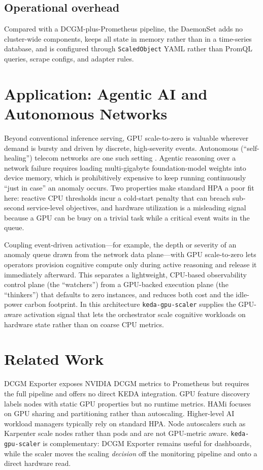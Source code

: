 \documentclass[11pt]{article}
\begin{document}
\subsection{Operational overhead}
Compared with a DCGM-plus-Prometheus pipeline, the DaemonSet adds no cluster-wide
components, keeps all state in memory rather than in a time-series database, and
is configured through \texttt{ScaledObject} YAML rather than PromQL queries,
scrape configs, and adapter rules.

\section{Application: Agentic AI and Autonomous Networks}

Beyond conventional inference serving, GPU scale-to-zero is valuable wherever
demand is bursty and driven by discrete, high-severity events. Autonomous
(``self-healing'') telecom networks are one such setting \cite{comsoc}. Agentic
reasoning over a network failure requires loading multi-gigabyte foundation-model
weights into device memory, which is prohibitively expensive to keep running
continuously ``just in case'' an anomaly occurs. Two properties make standard HPA
a poor fit here: reactive CPU thresholds incur a cold-start penalty that can
breach sub-second service-level objectives, and hardware utilization is a
misleading signal because a GPU can be busy on a trivial task while a critical
event waits in the queue.

Coupling event-driven activation---for example, the depth or severity of an
anomaly queue drawn from the network data plane---with GPU scale-to-zero lets
operators provision cognitive compute only during active reasoning and release it
immediately afterward. This separates a lightweight, CPU-based observability
control plane (the ``watchers'') from a GPU-backed execution plane (the
``thinkers'') that defaults to zero instances, and reduces both cost and the
idle-power carbon footprint. In this architecture \texttt{keda-gpu-scaler}
supplies the GPU-aware activation signal that lets the orchestrator scale
cognitive workloads on hardware state rather than on coarse CPU metrics.

\section{Related Work}

DCGM Exporter exposes NVIDIA DCGM metrics to Prometheus but requires the full
pipeline and offers no direct KEDA integration. GPU feature discovery labels
nodes with static GPU properties but no runtime metrics. HAMi \cite{hami}
focuses on GPU sharing and partitioning rather than autoscaling. Higher-level AI
workload managers typically rely on standard HPA. Node autoscalers such as
Karpenter scale nodes rather than pods and are not GPU-metric aware.
\texttt{keda-gpu-scaler} is complementary: DCGM Exporter remains useful for
dashboards, while the scaler moves the scaling \emph{decision} off the monitoring
pipeline and onto a direct hardware read.
\end{document}
